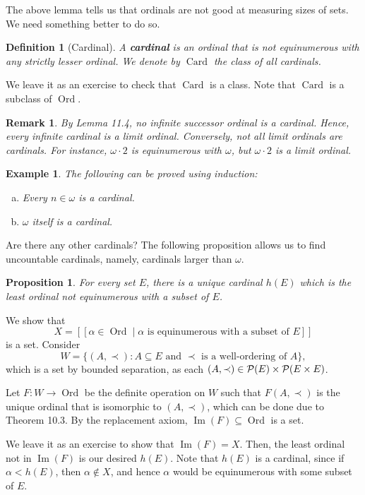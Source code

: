 \documentclass[10pt]{article}
\makeatletter
\DeclareMathOperator{\im}{Im}
\DeclareMathOperator{\Ord}{Ord}
\DeclareMathOperator{\Card}{Card}
\theoremstyle{newstyle}
\newtheorem{remark}[thm]{Remark}
\newtheorem{prop}[thm]{Proposition}
\newtheorem{defn}[thm]{Definition}
\newtheorem{exmp}[thm]{Example}
\newenvironment{pf}[1][\proofname]{\par
  \pushQED{\qed}%
  \normalfont \topsep0\p@\relax
  \trivlist
  \item[\hskip\labelsep\scshape
  #1\@addpunct{.}]\ignorespaces
}{%
  \popQED\endtrivlist\@endpefalse
}
\makeatother
\begin{document}
The above lemma tells us that ordinals are not good at measuring sizes of sets. 
We need something better to do so.

\begin{defn}[Cardinal] 
A {\bf cardinal} is an ordinal that is not equinumerous with any strictly lesser ordinal. 
We denote by $\Card$ the class of all cardinals. 
\end{defn} 

We leave it as an exercise to check that $\Card$ is a class. Note that 
$\Card$ is a subclass of $\Ord$. 

\begin{remark} 
By Lemma 11.4, no infinite successor ordinal is a cardinal. Hence, every infinite cardinal 
is a limit ordinal. Conversely, not all limit ordinals are cardinals. For instance, 
$\omega \cdot 2$ is equinumerous with $\omega$, but $\omega \cdot 2$ is a limit ordinal. 
\end{remark} 

\begin{exmp} The following can be proved using induction:  
\begin{enumerate}[(a)]
    \item Every $n \in \omega$ is a cardinal. 
    \item $\omega$ itself is a cardinal.
\end{enumerate} 
\end{exmp}

Are there any other cardinals? The following proposition allows us to find uncountable 
cardinals, namely, cardinals larger than $\omega$. 

\begin{prop} 
For every set $E$, there is a unique cardinal $h(E)$ which is the least ordinal not 
equinumerous with a subset of $E$. 
\end{prop} 
\begin{pf}
We show that 
\[ X = [[ \alpha \in \Ord \mid \alpha \text{ is equinumerous with a subset of $E$}]] \]
is a set. Consider 
\[ W = \{(A, \prec) : A \subseteq E \text{ and $\prec$ is a well-ordering of $A$}\}, \] 
which is a set by bounded separation, as each $(A, \prec) \in {\cal P}(E) \times {\cal P}(E \times E)$. 

Let $F : W \to \Ord$ be the definite operation on $W$ such that $F(A, \prec)$ is the unique 
ordinal that is isomorphic to $(A, \prec)$, which can be done due to Theorem 10.3. By the 
replacement axiom, $\im(F) \subseteq \Ord$ is a set. 

We leave it as an exercise to show that $\im(F) = X$. Then, the least ordinal not in 
$\im(F)$ is our desired $h(E)$. Note that $h(E)$ is a cardinal, since if $\alpha < h(E)$, 
then $\alpha \notin X$, and hence $\alpha$ would be equinumerous with some subset of $E$.
\end{pf}
\end{document}

